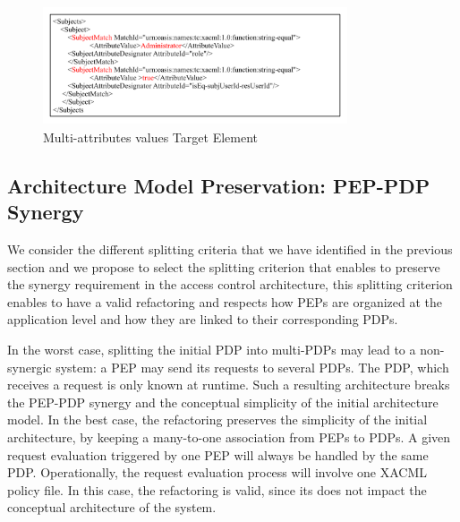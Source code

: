 \begin{figure}[!h]
\begin{center}
\includegraphics[width=9cm, height=3.5cm]{xacml-match}
\caption{Multi-attributes values Target Element}
\label{xacml-match}
\end{center}
\end{figure}
 


\subsection{Architecture Model Preservation: PEP-PDP Synergy}
We consider the different splitting criteria that we have identified in the previous section and we propose to select the splitting criterion that 
enables to preserve the synergy requirement in the access control architecture, this splitting criterion enables to have a valid refactoring and respects how PEPs are organized 
at the application level and how they are linked to their corresponding PDPs.

In the worst case, splitting the initial PDP into multi-PDPs may lead to a non-synergic system: a PEP may send its requests to several PDPs. 
The PDP, which receives a request is only known at runtime. Such a resulting architecture breaks the PEP-PDP synergy and the conceptual 
simplicity of the initial architecture model. In the best case, the refactoring preserves the simplicity of the initial architecture, by keeping a many-to-one association 
from PEPs to PDPs. A given request evaluation triggered by one PEP will always be handled by the same PDP. Operationally, the request evaluation process will involve 
one XACML policy file. In this case, the refactoring is valid, since its does not impact the conceptual architecture of the system.


